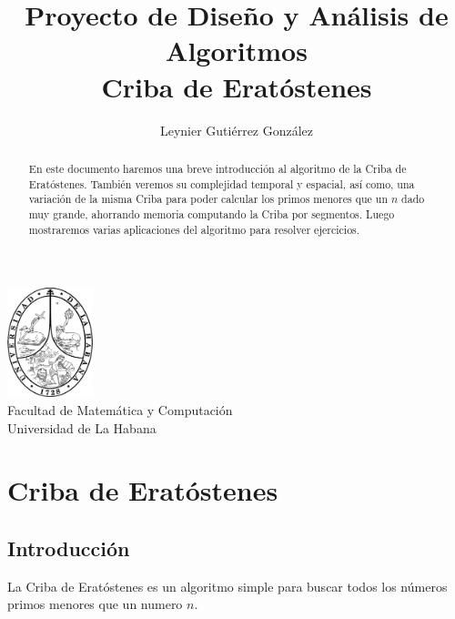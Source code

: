 \documentclass[12pt]{article}
\title{Proyecto de Diseño y Análisis de Algoritmos\\ \vspace{.2cm} \textbf{Criba de Eratóstenes}}
\author{Leynier Gutiérrez González}
\newcommand{\nl}{\vspace{0.3cm}}
\begin{document}
	
\maketitle

\vspace{0.5cm}

\begin{center}
	\vspace{0.2cm}
	\includegraphics[width=2.5cm]{images/escudo.png}\\
	\vspace{0.2cm}
	Facultad de Matemática y Computación\\
	\vspace{0.1cm}
	Universidad de La Habana\\
	\vspace{1cm}
\end{center}

\vspace{1cm}

\begin{abstract}
	En este documento haremos una breve introducción al algoritmo de la Criba de Eratóstenes. También veremos su complejidad temporal y espacial, así como, una variación de la misma Criba para poder calcular los primos menores que un $n$ dado muy grande, ahorrando memoria computando la Criba por segmentos. Luego mostraremos varias aplicaciones del algoritmo para resolver ejercicios.
\end{abstract}

\newpage

\tableofcontents

\newpage

\section{Criba de Eratóstenes}

\subsection{Introducción}

\nl

La Criba de Eratóstenes es un algoritmo simple para buscar todos los números primos menores que un numero $n$.
\end{document}
